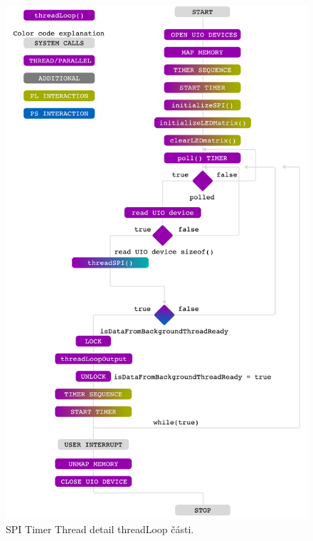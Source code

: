 \documentclass[a4paper, twoside, 11pt]{article}
\newcommand{\fbar}{\FloatBarrier}
\begin{document}
 		\begin{figure}[htbp!]
	  		\centering
	  		\includegraphics[width=1\textwidth]{src/pdf/threadLoop.pdf}
	 		\caption{SPI Timer Thread detail threadLoop části.}
  			\label{fig:threadLoop}
		\end{figure}
		\fbar
\end{document}
